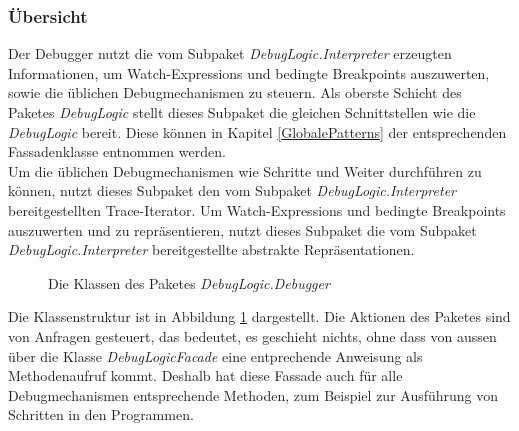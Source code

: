 \documentclass[parskip=full]{scrartcl}
\begin{document}
\subsubsection{Übersicht}
Der Debugger nutzt die vom Subpaket \textit{DebugLogic.Interpreter} erzeugten Informationen, um Watch-Expressions und bedingte Breakpoints auszuwerten, sowie die üblichen Debugmechanismen zu steuern.
Als oberste Schicht des Paketes \textit{DebugLogic} stellt dieses Subpaket die gleichen Schnittstellen wie die \textit{DebugLogic} bereit. Diese können in Kapitel \ref{GlobalePatterns} der entsprechenden Fassadenklasse entnommen werden. \\
Um die üblichen Debugmechanismen wie Schritte und Weiter durchführen zu können, nutzt dieses Subpaket den vom Subpaket \textit{DebugLogic.Interpreter} bereitgestellten Trace-Iterator. 
Um Watch-Expressions und bedingte Breakpoints auszuwerten und zu repräsentieren, nutzt dieses Subpaket die vom Subpaket \textit{DebugLogic.Interpreter} bereitgestellte abstrakte Repräsentationen.
\begin{figure}[!h]
\caption{Die Klassen des Paketes \textit{DebugLogic.Debugger}}
\label{fig:debuggerOverview}
\end{figure}
Die Klassenstruktur ist in Abbildung \ref{fig:debuggerOverview} dargestellt.
Die Aktionen des Paketes sind von Anfragen gesteuert, das bedeutet, es geschieht nichts, ohne dass von aussen über die Klasse \textit{DebugLogicFacade} eine entprechende Anweisung als Methodenaufruf kommt. Deshalb hat diese Fassade auch für alle Debugmechanismen entsprechende Methoden, zum Beispiel zur Ausführung von Schritten in den Programmen. \\
\end{document}
